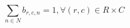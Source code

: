 \documentclass[10pt]{article}
\begin{document}
\[\sum_{n \in N} b_{r,c,n} = 1, \forall (r,c) \in R \times C\]
\end{document}
